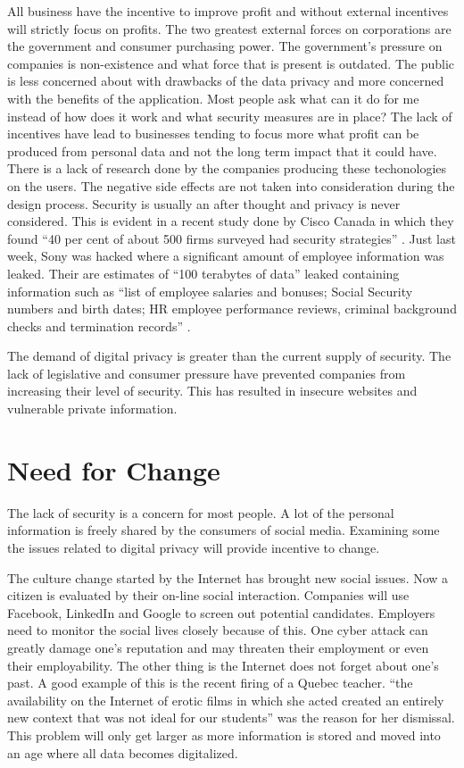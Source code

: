 \documentclass[12pt]{article}
\begin{document}
All business have the incentive to improve profit and without external incentives will strictly focus on profits. The two greatest external forces on corporations are the government and consumer purchasing power. The government's pressure on companies is non-existence and what force that is present is outdated. The public is less concerned about with drawbacks of the data privacy and more concerned with the benefits of the application. Most people ask what can it do for me instead of how does it work and what security measures are in place? The lack of incentives have lead to businesses tending to focus more what profit can be produced from personal data and not the long term impact that it could have. There is a lack of research done by the companies producing these techonologies on the users. The negative side effects are not taken into consideration during the design process. Security is usually an after thought and privacy is never considered. This is evident in a recent study done by Cisco Canada in which they found ``40 per cent of about 500 firms surveyed had security strategies'' \cite{Blackwell}. Just last week, Sony was hacked where a significant amount of employee information was leaked. Their are estimates of ``100 terabytes of data'' leaked containing information such as ``list of employee salaries and bonuses; Social Security numbers and birth dates; HR employee performance reviews, criminal background checks and termination records'' \cite{Zetter}.

The demand of digital privacy is greater than the current supply of security. The lack of legislative and consumer pressure have prevented companies from increasing their level of security. This has resulted in insecure websites and vulnerable private information. 

\section{Need for Change}\label{sec:change}
The lack of security is a concern for most people. A lot of the personal information is freely shared by the consumers of social media. Examining some the issues related to digital privacy will provide incentive to change.

The culture change started by the Internet has brought new social issues. Now a citizen is evaluated by their on-line social interaction. Companies will use Facebook, LinkedIn and Google to screen out potential candidates. Employers need to monitor the social lives closely because of this. One cyber attack can greatly damage one's reputation and may threaten their employment or even their employability. The other thing is the Internet does not forget about one's past. A good example of this is the recent firing of a Quebec teacher. ``the availability on the Internet of erotic films in which she acted created an entirely new context that was not ideal for our students'' \cite{Peritz} was the reason for her dismissal. This problem will only get larger as more information is stored and moved into an age where all data becomes digitalized.
\end{document}
